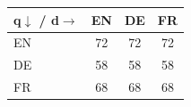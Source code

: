 \begin{tabular}{lccc}
\toprule
\textbf{q$\downarrow$ / d$\rightarrow$} & EN & DE & FR \\
\midrule
EN & \cellcolor{gray!15}72 & 72 & 72 \\
DE & 58 & \cellcolor{gray!15}58 & 58 \\
FR & 68 & 68 & \cellcolor{gray!15}68 \\
\bottomrule
\end{tabular}
